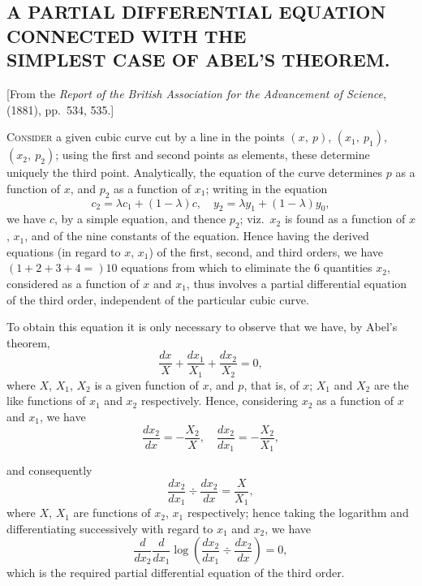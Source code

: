 \documentclass[11pt,a4paper]{book}
\begin{document}
\subsection*{A PARTIAL DIFFERENTIAL EQUATION CONNECTED WITH THE\\ SIMPLEST CASE OF ABEL'S THEOREM.}

\begin{center}
\small [From the \textit{Report of the British Association for the Advancement of Science}, (1881), pp.~534, 535.]
\end{center}

\medskip

\textsc{Consider} a given cubic curve cut by a line in the points $(x,\ p)$, $(x_1,\ p_1)$, $(x_2,\ p_2)$; using the first and second points as elements, these determine uniquely the third point. Analytically, the equation of the curve determines $p$ as a function of $x$, and $p_2$ as a function of $x_1$; writing in the equation
\[
c_2=\lambda c_1+(1-\lambda)c,\quad y_2=\lambda y_1+(1-\lambda)y_0,
\]
we have $c$, by a simple equation, and thence $p_2$; viz.\ $x_2$ is found as a function of $x$, $x_1$, and of the nine constants of the equation. Hence having the derived equations (in regard to $x$, $x_1$) of the first, second, and third orders, we have $(1+2+3+4=)10$ equations from which to eliminate the 6 quantities $x_2$, considered as a function of $x$ and $x_1$, thus involves a partial differential equation of the third order, independent of the particular cubic curve.

To obtain this equation it is only necessary to observe that we have, by Abel's theorem,
\[
\frac{dx}{X}+\frac{dx_1}{X_1}+\frac{dx_2}{X_2}=0,
\]
where $X$, $X_1$, $X_2$ is a given function of $x$, and $p$, that is, of $x$; $X_1$ and $X_2$ are the like functions of $x_1$ and $x_2$ respectively. Hence, considering $x_2$ as a function of $x$ and $x_1$, we have
\[
\frac{dx_2}{dx}=-\frac{X_2}{X},\quad \frac{dx_2}{dx_1}=-\frac{X_2}{X_1},
\]


\newpage
and consequently
\[
\frac{dx_2}{dx_1}\div\frac{dx_2}{dx}=\frac{X}{X_1},
\]
where $X$, $X_1$ are functions of $x_2$, $x_1$ respectively; hence taking the logarithm and differentiating successively with regard to $x_1$ and $x_2$, we have
\[
\frac{d}{dx_2}\frac{d}{dx_1}\log\left(\frac{dx_2}{dx_1}\div\frac{dx_2}{dx}\right)=0,
\]
which is the required partial differential equation of the third order.
\end{document}
